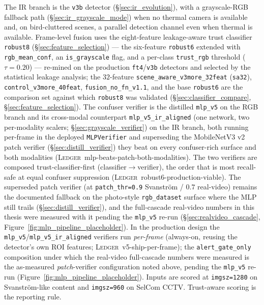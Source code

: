 \documentclass[12pt,a4paper,oneside,openright]{book}
\begin{document}
The IR branch is the \texttt{v3b} detector (\S\ref{sec:ir_evolution}), with a grayscale-RGB fallback path (\S\ref{sec:ir_grayscale_mode}) when no thermal camera is available and, on bird-cluttered scenes, a parallel detection channel even when thermal is available. Frame-level fusion uses the eight-feature leakage-aware trust classifier \texttt{robust8} (\S\ref{sec:feature_selection}) --- the six-feature \texttt{robust6} extended with \texttt{rgb\_mean\_conf}, an \texttt{is\_grayscale} flag, and a per-class \texttt{trust\_rgb} threshold ($\tau{=}0.20$) --- re-mined on the production \texttt{ft4}/\texttt{v3b} detectors and selected by the statistical leakage analysis; the $32$-feature \texttt{scene\_aware\_v3more\_32feat} (\texttt{sa32}), \texttt{control\_v3more\_40feat}, \texttt{fusion\_no\_fn\_v1.1}, and the base \texttt{robust6} are the comparison set against which \texttt{robust8} was validated (\S\ref{sec:classifier_compare}, \S\ref{sec:feature_selection}). The confuser verifier is the distilled \texttt{mlp\_v5} on the RGB branch and its cross-modal counterpart \texttt{mlp\_v5\_ir\_aligned} (one network, two per-modality scalers; \S\ref{sec:grayscale_verifier}) on the IR branch, both running per-frame in the deployed \texttt{MLPVerifier} and superseding the MobileNetV3 v2 patch verifier (\S\ref{sec:distill_verifier}) they beat on every confuser-rich surface and both modalities (\textsc{Ledger}~mlp-beats-patch-both-modalities). The two verifiers are composed trust-classifier-first (classifier$\to$verifier), the order that is most recall-safe at equal confuser suppression (\textsc{Ledger}~robust6-production-viable). The superseded patch verifier (at \texttt{patch\_thr=0.9} Svanstr\"om / $0.7$ real-video) remains the documented fallback on the photo-style \texttt{rgb\_dataset} surface where the MLP still trails (\S\ref{sec:distill_verifier}), and the full-cascade real-video numbers in this thesis were measured with it pending the \texttt{mlp\_v5} re-run (\S\ref{sec:realvideo_cascade}, Figure~\ref{fig:mlp_pipeline_placeholder}). In the production design the \texttt{mlp\_v5}/\texttt{mlp\_v5\_ir\_aligned} verifiers run \emph{per-frame} (always-on, reusing the detector's own ROI features; \textsc{Ledger}~v5-ship-per-frame); the \texttt{alert\_gate\_only} composition under which the real-video full-cascade numbers were measured is the as-measured \emph{patch}-verifier configuration noted above, pending the \texttt{mlp\_v5} re-run (Figure~\ref{fig:mlp_pipeline_placeholder}). Inputs are scored at \texttt{imgsz=1280} on Svanstr\"om-like content and \texttt{imgsz=960} on SelCom CCTV. Trust-aware scoring is the reporting rule.
\end{document}
